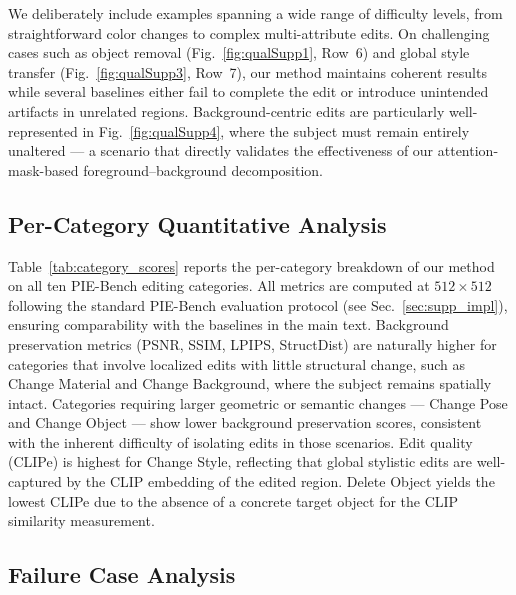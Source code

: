 We deliberately include examples spanning a wide range of difficulty levels, from straightforward color changes to complex multi-attribute edits. On challenging cases such as object removal (Fig.~\ref{fig:qualSupp1}, Row~6) and global style transfer (Fig.~\ref{fig:qualSupp3}, Row~7), our method maintains coherent results while several baselines either fail to complete the edit or introduce unintended artifacts in unrelated regions. Background-centric edits are particularly well-represented in Fig.~\ref{fig:qualSupp4}, where the subject must remain entirely unaltered — a scenario that directly validates the effectiveness of our attention-mask-based foreground--background decomposition.



\subsection{Per-Category Quantitative Analysis}
\label{sec:supp_category}

Table~\ref{tab:category_scores} reports the per-category breakdown of our method on all ten PIE-Bench editing categories.
All metrics are computed at $512{\times}512$ following the standard PIE-Bench evaluation protocol (see Sec.~\ref{sec:supp_impl}), ensuring comparability with the baselines in the main text.
Background preservation metrics (PSNR, SSIM, LPIPS, StructDist) are naturally higher for categories that involve localized edits with little structural change, such as Change Material and Change Background, where the subject remains spatially intact.
Categories requiring larger geometric or semantic changes — Change Pose and Change Object — show lower background preservation scores, consistent with the inherent difficulty of isolating edits in those scenarios.
Edit quality (CLIPe) is highest for Change Style, reflecting that global stylistic edits are well-captured by the CLIP embedding of the edited region.
Delete Object yields the lowest CLIPe due to the absence of a concrete target object for the CLIP similarity measurement.



\subsection{Failure Case Analysis}
\label{sec:supp_failure}

